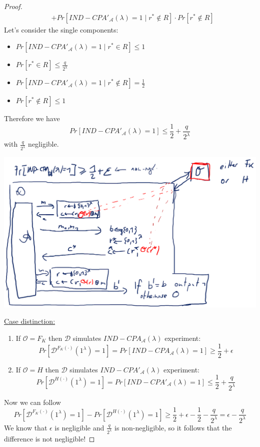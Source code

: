 \begin{proof}
\begin{align*}
			&+ Pr[IND-CPA'_{\mathcal{A}}(\lambda) = 1 \mid r^* \notin R] \cdot Pr[r^* \notin R]
		\end{align*}
		Let's consider the single components:
		\begin{itemize}
			\item $Pr[IND-CPA'_{\mathcal{A}}(\lambda) = 1 \mid r^* \in R] \leq 1$
			\item $Pr[r^* \in R] \leq \frac{q}{2^{\lambda}}$
			\item $Pr[IND-CPA'_{\mathcal{A}}(\lambda) = 1 \mid r^* \notin R] = \frac{1}{2}$
			\item $Pr[r^* \notin R] \leq 1$
		\end{itemize}
		Therefore we have
		$$Pr[IND-CPA'_{\mathcal{A}}(\lambda) = 1] \leq \frac{1}{2} + \frac{q}{2^{\lambda}}$$
		with $\frac{q}{2^{\lambda}}$ negligible.
	    \begin{center}
			\includegraphics[width=148mm]{Graphics/CPA/cpa5.png}
		\end{center}
		\underline{Case distinction:}
		\begin{enumerate}
			\item If $\mathcal{O} = F_K$ then $\mathcal{D}$ simulates $IND-CPA_{\mathcal{A}}(\lambda)$ experiment:
				$$Pr[\mathcal{D}^{F_K(\cdot)}(1^{\lambda}) = 1] = Pr[IND-CPA_{\mathcal{A}}(\lambda) = 1] \geq \frac{1}{2} + \epsilon$$
			\item If $\mathcal{O} = H$ then $\mathcal{D}$ simulates $IND-CPA'_{\mathcal{A}}(\lambda)$ experiment:
				$$Pr[\mathcal{D}^{H(\cdot)}(1^{\lambda}) = 1] = Pr[IND-CPA'_{\mathcal{A}}(\lambda) = 1] \leq \frac{1}{2} + \frac{q}{2^{\lambda}}$$
		\end{enumerate}
		Now we can follow
		$$Pr[\mathcal{D}^{F_K(\cdot)}(1^{\lambda}) = 1] - Pr[\mathcal{D}^{H(\cdot)}(1^{\lambda}) = 1]
		\geq \frac{1}{2} + \epsilon - \frac{1}{2} - \frac{q}{2^{\lambda}} = \epsilon - \frac{q}{2^{\lambda}}$$
		We know that $\epsilon$ is negligible and $\frac{q}{2^{\lambda}}$ is non-negligible, so it follows that the difference is not negligible! 
	\end{proof}
	
